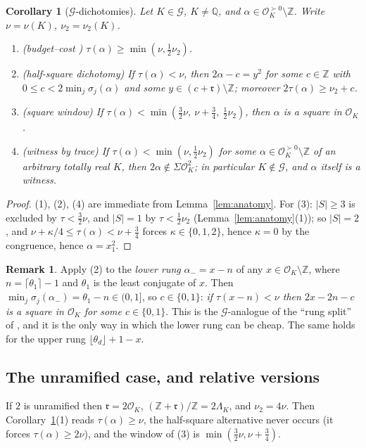 \documentclass[11pt,reqno]{amsart}
\theoremstyle{plain}
\newtheorem{corollary}[theorem]{Corollary}
\theoremstyle{definition}
\newtheorem{remark}[theorem]{Remark}
\newcommand{\Z}{\mathbb{Z}}
\newcommand{\Q}{\mathbb{Q}}
\newcommand{\OK}{\mathcal{O}_K}
\newcommand{\rr}{\mathfrak{r}}
\newcommand{\Gcl}{\mathcal{G}}
\newcommand{\SoS}{\Sigma\OK^{2}}
\newcommand{\tp}{\succ 0}
\begin{document}
\begin{corollary}[$\Gcl$-dichotomies]\label{cor:dich}
Let $K\in\Gcl$, $K\ne\Q$, and $\alpha\in\OK^{\tp}\setminus\Z$. Write $\nu=\nu(K)$, $\nu_2=\nu_2(K)$.
\begin{enumerate}
\item \textup{(budget--cost \cite[budget--cost inequality]{PB})} $\tau(\alpha)\ge\min(\nu,\frac12\nu_2)$.
\item \textup{(half-square dichotomy)} If $\tau(\alpha)<\nu$, then $2\alpha-c=y^{2}$ for some $c\in\Z$
with $0\le c<2\min_j\sigma_j(\alpha)$ and some $y\in(c+\rr)\setminus\Z$; moreover
$2\tau(\alpha)\ge\nu_2+c$.
\item \textup{(square window)} If $\tau(\alpha)<\min(\frac32\nu,\ \nu+\frac34,\ \frac12\nu_2)$, then
$\alpha$ is a square in $\OK$.
\item \textup{(witness by trace)} If $\tau(\alpha)<\min(\nu,\frac12\nu_2)$ for some
$\alpha\in\OK^{\tp}\setminus\Z$ of an arbitrary totally real $K$, then $2\alpha\notin\SoS$; in
particular $K\notin\Gcl$, and $\alpha$ itself is a witness.
\end{enumerate}
\end{corollary}

\begin{proof}
(1), (2), (4) are immediate from Lemma~\ref{lem:anatomy}. For (3): $|S|\ge3$ is excluded by
$\tau<\frac32\nu$, and $|S|=1$ by $\tau<\frac12\nu_2$ (Lemma~\ref{lem:anatomy}(1)); so $|S|=2$, and
$\nu+\kappa/4\le\tau(\alpha)<\nu+\frac34$ forces $\kappa\in\{0,1,2\}$, hence $\kappa=0$ by the
congruence, hence $\alpha=x_1^{2}$.
\end{proof}

\begin{remark}\label{rem:rung}
Apply (2) to the \emph{lower rung} $\alpha_-=x-n$ of any $x\in\OK\setminus\Z$, where
$n=\lceil\theta_1\rceil-1$ and $\theta_1$ is the least conjugate of $x$. Then
$\min_j\sigma_j(\alpha_-)=\theta_1-n\in(0,1]$, so $c\in\{0,1\}$: \emph{if $\tau(x-n)<\nu$ then
$2x-2n-c$ is a square in $\OK$ for some $c\in\{0,1\}$}. This is the $\Gcl$-analogue of the ``rung
split'' of \cite[degree-$8$ rung split]{TwoO}, and it is the only way in which the lower rung can be cheap. The same
holds for the upper rung $\lfloor\theta_d\rfloor+1-x$.
\end{remark}

\subsection{The unramified case, and relative versions}
If $2$ is unramified then $\rr=2\OK$, $(\Z+\rr)/\Z=2\Lambda_K$, and $\nu_2=4\nu$. Then
Corollary~\ref{cor:dich}(1) reads $\tau(\alpha)\ge\nu$, the half-square alternative never occurs
(it forces $\tau(\alpha)\ge2\nu$), and the window of (3) is $\min(\frac32\nu,\nu+\frac34)$.
\end{document}
